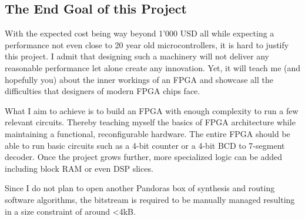 \subsection{The End Goal of this Project}

With the expected cost being way beyond 1'000 USD all while expecting a performance not even close to 20 year old microcontrollers, it is hard to justify this project.
I admit that designing such a machinery will not deliver any reasonable performance let alone create any innovation.
Yet, it will teach me (and hopefully you) about the inner workings of an FPGA and showcase all the difficulties that designers of modern FPGA chips face.

What I aim to achieve is to build an FPGA with enough complexity to run a few relevant circuits. Thereby teaching myself the basics of FPGA architecture while maintaining a functional, reconfigurable hardware. 
The entire FPGA should be able to run basic circuits such as a 4-bit counter or a 4-bit BCD to 7-segment decoder.
Once the project grows further, more specialized logic can be added including block RAM or even DSP slices.

Since I do not plan to open another Pandoras box of synthesis and routing software algorithms, the bitstream is required to be manually managed resulting in a size constraint of around <4kB.

